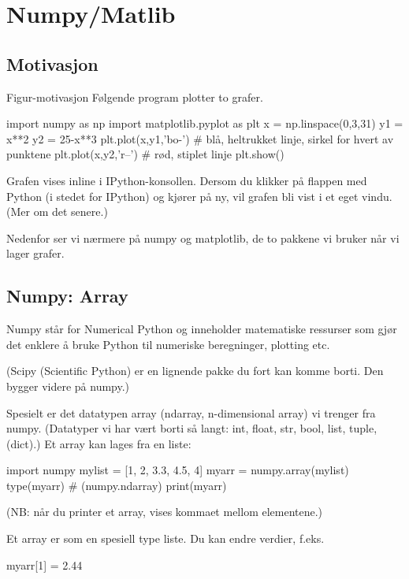 \chapter{Numpy/Matlib}

\section{Motivasjon}

Figur-motivasjon
Følgende program plotter to grafer. 

\begin{usncodebox}
import numpy as np
import matplotlib.pyplot as plt   
x = np.linspace(0,3,31)
y1 = x**2
y2 = 25-x**3
plt.plot(x,y1,'bo-')   # blå, heltrukket linje, sirkel for hvert av punktene  
plt.plot(x,y2,'r--')   # rød, stiplet linje
plt.show()
\end{usncodebox}

Grafen vises inline i IPython-konsollen. Dersom du klikker på flappen med Python (i stedet for IPython) og kjører på ny, vil grafen bli vist i et eget vindu. (Mer om det senere.) 

Nedenfor ser vi nærmere på numpy og matplotlib, de to pakkene vi bruker når vi lager grafer. 

\section{Numpy: Array}

Numpy står for Numerical Python og inneholder matematiske ressurser som gjør det enklere å bruke Python til numeriske beregninger, plotting etc. 

(Scipy (Scientific Python) er en lignende pakke du fort kan komme borti. Den bygger videre på numpy.)

Spesielt er det datatypen array (ndarray, n-dimensional array) vi trenger fra numpy. (Datatyper vi har vært borti så langt: int, float, str, bool, list, tuple, (dict).) Et array kan lages fra en liste:

\begin{usncodebox}
import numpy
mylist = [1, 2, 3.3, 4.5, 4] 
myarr = numpy.array(mylist) 
type(myarr)    # (numpy.ndarray)
print(myarr)
\end{usncodebox}

(NB: når du printer et array, vises kommaet mellom elementene.)  

Et array er som en spesiell type liste. Du kan endre verdier, f.eks.
\begin{usncodebox}
myarr[1] = 2.44
\end{usncodebox}

